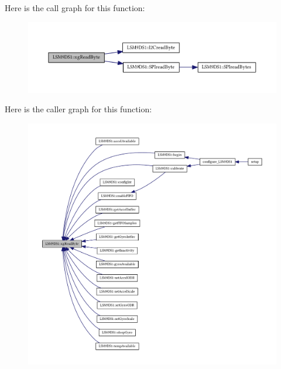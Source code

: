 Here is the call graph for this function\+:\nopagebreak
\begin{figure}[H]
\begin{center}
\leavevmode
\includegraphics[width=350pt]{class_l_s_m9_d_s1_af7f9789df6f0178764c815a3380c202a_cgraph}
\end{center}
\end{figure}




Here is the caller graph for this function\+:
\nopagebreak
\begin{figure}[H]
\begin{center}
\leavevmode
\includegraphics[width=350pt]{class_l_s_m9_d_s1_af7f9789df6f0178764c815a3380c202a_icgraph}
\end{center}
\end{figure}


